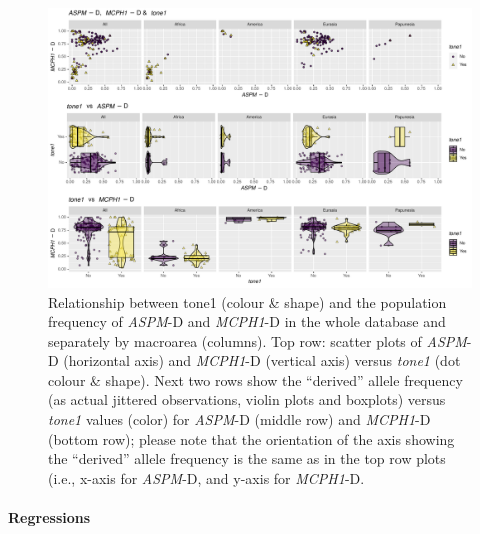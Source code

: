 \documentclass[twoside,onecolumn]{article}
\begin{document}
\begin{figure}[h]
  \centering
  \includegraphics[width=\textwidth]{../../code/figures/tone1_alleles}
  \caption{Relationship between tone1 (colour \& shape) and the population frequency of \textit{ASPM}-D and \textit{MCPH1}-D in the whole database and separately by macroarea (columns). Top row: scatter plots of \textit{ASPM}-D (horizontal axis) and \textit{MCPH1}-D (vertical axis) versus \textit{tone1} (dot colour \& shape). Next two rows show the ``derived'' allele frequency (as actual jittered observations, violin plots and boxplots) versus \textit{tone1} values (color) for \textit{ASPM}-D (middle row) and \textit{MCPH1}-D (bottom row); please note that the orientation of the axis showing the ``derived'' allele frequency is the same as in the top row plots (i.e., x-axis for \textit{ASPM}-D, and y-axis for \textit{MCPH1}-D.}
  \label{Fig:tone1_alleles}
\end{figure}


\paragraph{Regressions}
\end{document}
